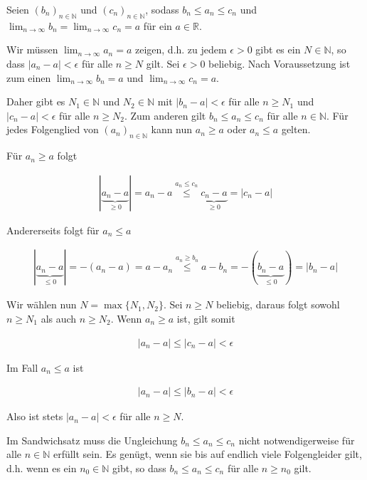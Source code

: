\documentclass[fontsize=9pt,
               parskip=half-,
               DIV=14,
               listof=chapterentry,
               tocflat]{scrbook}
\begin{document}
\begin{proof*}[Sandwichsatz]
Seien $(b_{n})_{n\in \mathbb {N} }$ und $(c_{n})_{n\in \mathbb {N} }$, sodass $b_{n}\leq a_{n}\leq c_{n}$ und $\lim _{n\rightarrow \infty }b_{n}=\lim _{n\rightarrow \infty }c_{n}=a$ für ein $a\in \mathbb {R} $.

Wir müssen $\lim _{n\to \infty }a_{n}=a$ zeigen, d.h. zu jedem $\epsilon >0$ gibt es ein $N\in \mathbb {N} $, so dass $|a_{n}-a|<\epsilon $ für alle $n\geq N$ gilt. Sei $\epsilon >0$ beliebig. Nach Voraussetzung ist zum einen $\lim _{n\to \infty }b_{n}=a$ und $\lim _{n\to \infty }c_{n}=a$.

Daher gibt es $N_{1}\in \mathbb {N} $ und $N_{2}\in \mathbb {N} $ mit $|b_{n}-a|<\epsilon $ für alle $n\geq N_{1}$ und $|c_{n}-a|<\epsilon $ für alle $n\geq N_{2}$. Zum anderen gilt $b_{n}\leq a_{n}\leq c_{n}$ für alle $n\in \mathbb {N} $. Für jedes Folgenglied von $(a_{n})_{n\in \mathbb {N} }$ kann nun $a_{n}\geq a$ oder $a_{n}\leq a$ gelten.

Für $a_{n}\geq a$ folgt

\begin{align*}
|\underbrace {a_{n}-a} _{\geq 0}|=a_{n}-a{\overset {a_{n}\leq c_{n}}{\leq }}\underbrace {c_{n}-a} _{\geq 0}=|c_{n}-a|
\end{align*}

Andererseits folgt für $a_{n}\leq a$

\begin{align*}
|\underbrace {a_{n}-a} _{\leq 0}|=-(a_{n}-a)=a-a_{n}{\overset {a_{n}\geq b_{n}}{\leq }}a-b_{n}=-(\underbrace {b_{n}-a} _{\leq 0})=|b_{n}-a|
\end{align*}

Wir wählen nun $N=\max\{N_{1},N_{2}\}$. Sei $n\geq N$ beliebig, daraus folgt sowohl $n\geq N_{1}$ als auch $n\geq N_{2}$. Wenn $a_{n}\geq a$ ist, gilt somit

\begin{align*}
|a_{n}-a|\leq |c_{n}-a|<\epsilon 
\end{align*}

Im Fall $a_{n}\leq a$ ist

\begin{align*}
|a_{n}-a|\leq |b_{n}-a|<\epsilon 
\end{align*}

Also ist stets $|a_{n}-a|<\epsilon $ für alle $n\geq N$.

\end{proof*}

\begin{hint*}
Im Sandwichsatz muss die Ungleichung $b_{n}\leq a_{n}\leq c_{n}$ nicht notwendigerweise für alle $n\in \mathbb {N} $ erfüllt sein. Es genügt, wenn sie bis auf endlich viele Folgengleider gilt, d.h. wenn es ein $n_{0}\in \mathbb {N} $ gibt, so dass $b_{n}\leq a_{n}\leq c_{n}$ für alle $n\geq n_{0}$ gilt.

\end{hint*}
\end{document}
